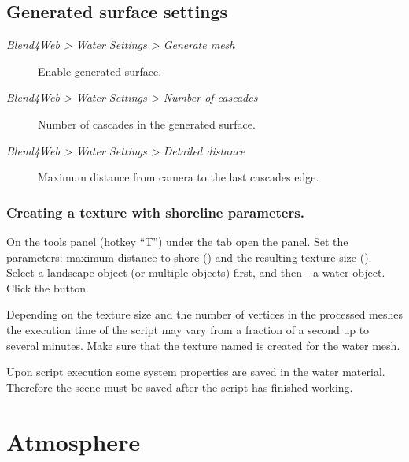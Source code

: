 \documentclass[a4paper,12pt,oneside]{sphinxmanual}
\begin{document}
\subsection{Generated surface settings}
\label{outdoor_rendering:id23}\begin{description}
\item[{\emph{Blend4Web \textgreater{} Water Settings \textgreater{} Generate mesh}}] \leavevmode
Enable generated surface.

\item[{\emph{Blend4Web \textgreater{} Water Settings \textgreater{} Number of cascades}}] \leavevmode
Number of cascades in the generated surface.

\item[{\emph{Blend4Web \textgreater{} Water Settings \textgreater{} Detailed distance}}] \leavevmode
Maximum distance from camera to the last cascades edge.

\end{description}


\subsubsection{Creating a texture with shoreline parameters.}
\label{outdoor_rendering:index-0}\label{outdoor_rendering:id24}\label{outdoor_rendering:shore-distance-bake}
On the tools panel (hotkey ``T'') under the  tab open the  panel. Set the parameters: maximum distance to shore () and the resulting texture size (). Select a landscape object (or multiple objects) first, and then - a water object. Click the  button.

Depending on the texture size and the number of vertices in the processed meshes the execution time of the script may vary from a fraction of a second up to several minutes. Make sure that the texture named  is created for the water mesh.

Upon script execution some system properties are saved in the water material. Therefore the scene must be saved after the script has finished working.


\section{Atmosphere}
\label{outdoor_rendering:id25}
\end{document}
